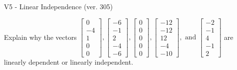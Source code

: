 \begin{exercise}
  \begin{exerciseTitle}V5 - Linear Independence (ver. 305)\end{exerciseTitle}
  \begin{exerciseStatement}
    Explain why the vectors \(\left[\begin{array}{r}
0 \\
-4 \\
1 \\
0 \\
0
\end{array}\right] , \left[\begin{array}{r}
-6 \\
-1 \\
2 \\
-4 \\
-6
\end{array}\right] , \left[\begin{array}{r}
0 \\
0 \\
0 \\
0 \\
0
\end{array}\right] , \left[\begin{array}{r}
-12 \\
-12 \\
12 \\
-4 \\
-10
\end{array}\right] , \text{ and } \left[\begin{array}{r}
-2 \\
-1 \\
4 \\
-1 \\
2
\end{array}\right]\) are linearly dependent or linearly independent.	



\end{exerciseStatement}
\end{exercise}
